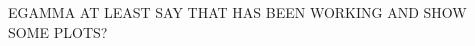 \begin{normalsize}
  EGAMMA AT LEAST SAY THAT HAS BEEN WORKING AND SHOW SOME PLOTS?

\end{normalsize}       %
 
